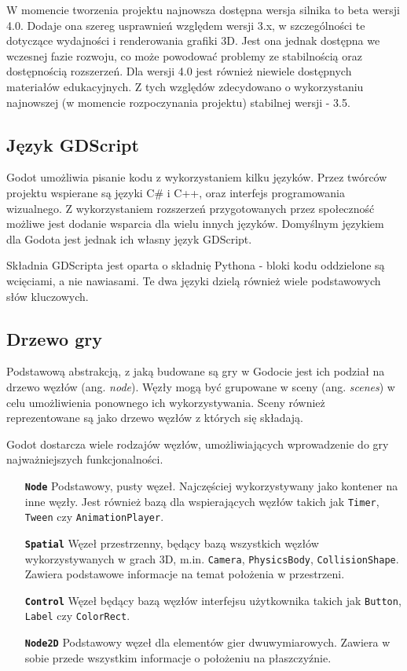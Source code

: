 W momencie tworzenia projektu najnowsza dostępna wersja silnika to beta wersji 4.0. Dodaje ona szereg usprawnień względem wersji 3.x, w szczególności te dotyczące wydajności i renderowania grafiki 3D. Jest ona jednak dostępna we wczesnej fazie rozwoju, co może powodować problemy ze stabilnością oraz dostępnością rozszerzeń. Dla wersji 4.0 jest również niewiele dostępnych materiałów edukacyjnych. Z tych względów zdecydowano o wykorzystaniu najnowszej (w momencie rozpoczynania projektu) stabilnej wersji - 3.5. 

\subsection{Język GDScript}
Godot umożliwia pisanie kodu z wykorzystaniem kilku języków. Przez twórców projektu wspierane są języki C\# i C++, oraz interfejs programowania wizualnego. Z wykorzystaniem rozszerzeń przygotowanych przez społeczność możliwe jest dodanie wsparcia dla wielu innych języków. Domyślnym językiem dla Godota jest jednak ich własny język GDScript. 

Składnia GDScripta jest oparta o składnię Pythona - bloki kodu oddzielone są wcięciami, a nie nawiasami. Te dwa języki dzielą również wiele podstawowych słów kluczowych. 

\subsection{Drzewo gry}
Podstawową abstrakcją, z jaką budowane są gry w Godocie jest ich podział na drzewo węzłów (ang. \emph{node}). Węzły mogą być grupowane w sceny (ang. \emph{scenes}) w celu umożliwienia ponownego ich wykorzystywania. Sceny również reprezentowane są jako drzewo węzłów z których się składają. 

Godot dostarcza wiele rodzajów węzłów, umożliwiających wprowadzenie do gry najważniejszych funkcjonalności. 

\begin{itemize}
    \item[\textbf{\texttt{Node}}] Podstawowy, pusty węzeł. Najczęściej wykorzystywany jako kontener na inne węzły. Jest również bazą dla wspierających węzłów takich jak \texttt{Timer}, \texttt{Tween} czy \texttt{AnimationPlayer}.
    \item[\textbf{\texttt{Spatial}}] Węzeł przestrzenny, będący bazą wszystkich węzłów wykorzystywanych w grach 3D, m.in. \texttt{Camera}, \texttt{PhysicsBody}, \texttt{CollisionShape}. Zawiera podstawowe informacje na temat położenia w przestrzeni.
    \item[\textbf{\texttt{Control}}] Węzeł będący bazą węzłów interfejsu użytkownika takich jak \texttt{Button}, \texttt{Label} czy \texttt{ColorRect}.
    \item[\textbf{\texttt{Node2D}}] Podstawowy węzeł dla elementów gier dwuwymiarowych. Zawiera w sobie przede wszystkim informacje o położeniu na płaszczyźnie. 
\end{itemize}


